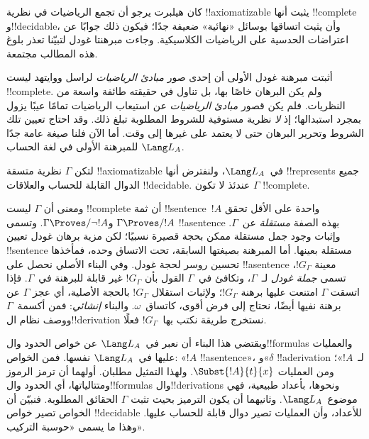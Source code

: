 \documentclass[../../../include/open-logic-section]{subfiles}
\begin{document}


كان هيلبرت يرجو أن تجمع الرياضيات في نظرية
!!{axiomatizable} يثبت أنها !!{complete} و!!{decidable}،
وأن يثبت اتساقها بوسائل «نهائية» ضعيفة جدًا؛ فيكون
ذلك جوابًا عن اعتراضات الحدسية على الرياضيات
الكلاسيكية. وجاءت مبرهنتا غودل لتبيّنا تعذر بلوغ
هذه المطالب مجتمعة.

أثبتت مبرهنة غودل الأولى أن إحدى صور
\emph{مبادئ الرياضيات} لراسل ووايتهد ليست
!!{complete}. ولم يكن البرهان خاصًا بها، بل
تناول في حقيقته طائفة واسعة من النظريات.
فلم يكن قصور \emph{مبادئ الرياضيات} عن استيعاب
الرياضيات تمامًا عيبًا يزول بمجرد استبدالها؛
إذ \emph{لا} نظرية مستوفية للشروط المطلوبة
تبلغ ذلك. وقد احتاج تعيين تلك الشروط وتحرير
البرهان حتى لا يعتمد على غيرها إلى وقت.
أما الآن فلنا صيغة عامة جدًا للمبرهنة الأولى
في لغة الحساب $\Lang L_A$.

\begin{thm}
لتكن $\Gamma$ نظرية متسقة !!{axiomatizable}
في~$\Lang L_A$، ولنفترض أنها !!{represents} جميع الدوال
القابلة للحساب والعلاقات !!{decidable}.
عندئذ لا تكون $\Gamma$ !!{complete}.
\end{thm}

ومعنى أن $\Gamma$ ليست !!{complete} أن ثمة
!!{sentence}~$!A$ واحدة على الأقل تحقق
$\Gamma\Proves/ !A$ و$\Gamma\Proves/\lnot !A$.
وتسمى !!a{sentence} بهذه الصفة \emph{مستقلة}
عن~$\Gamma$. وإثبات وجود جمل مستقلة ممكن
بحجة قصيرة نسبيًا؛ لكن مزية برهان غودل
تعيين !!{sentence} مستقلة بعينها. أما
المبرهنة بصيغتها السابقة، تحت الاتساق وحده،
فمأخذها تحسين روسر لحجة غودل. وفي البناء
الأصلي نحصل على !!a{sentence} معينة
$!G_\Gamma$، تسمى \emph{جملة غودل}
لـ~$\Gamma$، وتكافئ في~$\Gamma$ القول
بأن $!G_\Gamma$ غير قابلة للبرهنة في~$\Gamma$.
فإذا اتسقت $\Gamma$ امتنعت عليها برهنة
$!G_\Gamma$؛ ولإثبات استقلال $!G_\Gamma$
بالحجة الأصلية، أي عجز $\Gamma$ عن برهنة
نفيها أيضًا، نحتاج إلى فرض أقوى، كاتساق~$\omega$.
والبناء \emph{إنشائي}: فمن أكسمة~$\Gamma$
ووصف نظام ال!!{derivation} نستخرج طريقة
نكتب بها~$!G_\Gamma$ فعلًا.

ويقتضي هذا البناء أن نعبر في~$\Lang L_A$
عن خواص الحدود وال!!{formula}s والعمليات
عليها في~$\Lang L_A$ نفسها. فمن الخواص:
«$!A$ !!a{sentence}»، و«$\delta$
!!a{derivation} لـ~$!A$»؛ ومن العمليات
$\Subst{!A}{t}{x}$. ولهذا التمثيل مطلبان.
أولهما أن ترمز الرموز ومتتالياتها، أي الحدود
وال!!{formula}s وال!!{derivation}s ونحوها،
بأعداد طبيعية، فهي موضوع~$\Lang L_A$.
وثانيهما أن يكون الترميز بحيث تثبت $\Gamma$
الحقائق المطلوبة. فنبيّن أن الخواص تصير
خواص !!{decidable} للأعداد، وأن العمليات
تصير دوال قابلة للحساب عليها. وهذا ما يسمى
«حوسبة التركيب».
\end{document}
